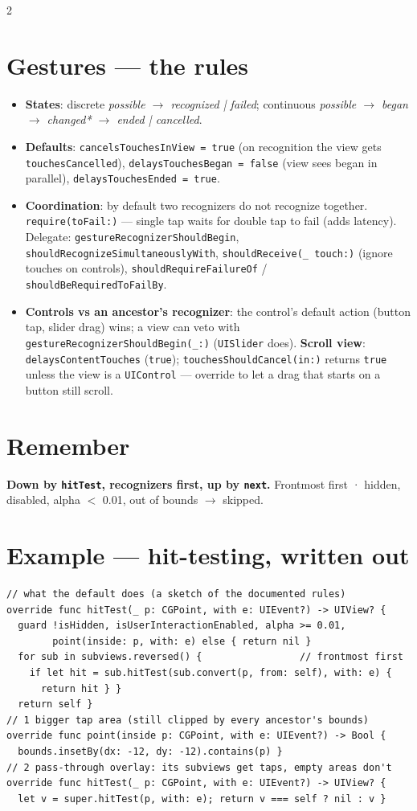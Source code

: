 \documentclass[8pt]{extarticle}
\newcommand\ct[1]{\texttt{#1}}
\begin{document}
\begin{multicols}{2}
\section{Gestures — the rules}
\begin{itemize}
  \item \textbf{States}: discrete \emph{possible $\to$ recognized | failed}; continuous
        \emph{possible $\to$ began $\to$ changed* $\to$ ended | cancelled}.
  \item \textbf{Defaults}: \ct{cancelsTouchesInView = true} (on recognition the view gets
        \ct{touchesCancelled}), \ct{delaysTouchesBegan = false} (view sees began in parallel),
        \ct{delaysTouchesEnded = true}.
  \item \textbf{Coordination}: by default two recognizers do not recognize together.
        \ct{require(toFail:)} — single tap waits for double tap to fail (adds latency).
        Delegate: \ct{gestureRecognizerShouldBegin}, \ct{shouldRecognizeSimultaneouslyWith},
        \ct{shouldReceive(\_ touch:)} (ignore touches on controls),
        \ct{shouldRequireFailureOf} / \ct{shouldBeRequiredToFailBy}.
  \item \textbf{Controls vs an ancestor's recognizer}: the control's default action (button
        tap, slider drag) wins; a view can veto with
        \ct{gestureRecognizerShouldBegin(\_:)} (\ct{UISlider} does). \textbf{Scroll view}:
        \ct{delaysContentTouches} (\ct{true}); \ct{touchesShouldCancel(in:)} returns
        \ct{true} unless the view is a \ct{UIControl} — override to let a drag that starts on
        a button still scroll.
\end{itemize}

\section{Remember}
\textbf{Down by \ct{hitTest}, recognizers first, up by \ct{next}.} Frontmost first · hidden,
disabled, alpha $<$ 0.01, out of bounds $\to$ skipped.

\columnbreak

\section{Example — hit-testing, written out}
\begin{lstlisting}[language=SwiftSheet]
// what the default does (a sketch of the documented rules)
override func hitTest(_ p: CGPoint, with e: UIEvent?) -> UIView? {
  guard !isHidden, isUserInteractionEnabled, alpha >= 0.01,
        point(inside: p, with: e) else { return nil }
  for sub in subviews.reversed() {                 // frontmost first
    if let hit = sub.hitTest(sub.convert(p, from: self), with: e) {
      return hit } }
  return self }
// 1 bigger tap area (still clipped by every ancestor's bounds)
override func point(inside p: CGPoint, with e: UIEvent?) -> Bool {
  bounds.insetBy(dx: -12, dy: -12).contains(p) }
// 2 pass-through overlay: its subviews get taps, empty areas don't
override func hitTest(_ p: CGPoint, with e: UIEvent?) -> UIView? {
  let v = super.hitTest(p, with: e); return v === self ? nil : v }
\end{lstlisting}


\end{multicols}
\end{document}
